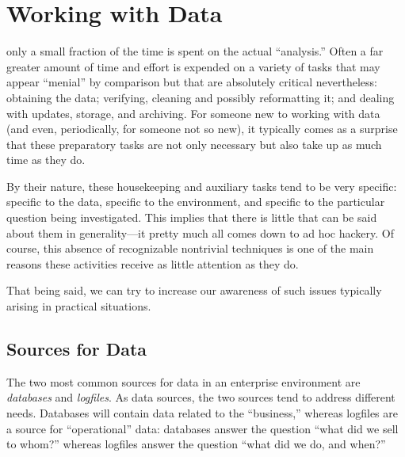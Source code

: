 

\chapter{Working with Data}{}{}
\label{app:data}

\makeatletter
\renewcommand\thefigure{C-\@arabic\c@figure}%
%
\renewcommand\thetable{C-\@arabic\c@table}%
\makeatother



 only a small fraction of the time is spent
on the actual ``analysis.'' Often a far greater amount of time and
effort is expended on a variety of tasks that may appear ``menial'' by
comparison but that are absolutely critical nevertheless: obtaining
the data; verifying, cleaning and possibly reformatting it; and
dealing with updates, storage, and archiving.  For someone new to
working with data (and even, periodically, for someone not so new), it
typically comes as a surprise that these preparatory tasks are not
only necessary but also take up as much time as they do.

By their nature, these housekeeping and auxiliary tasks tend to be
very specific: specific to the data, specific to the environment, and
specific to the particular question being investigated.  This implies
that there is little that can be said about them in generality---it
pretty much all comes down to ad hoc hackery. Of course, this absence
of recognizable nontrivial techniques is one of the main reasons these
activities receive as little attention as they do.

That being said, we can try to increase our awareness of such issues
typically arising in practical situations.\vspace*{-12pt}

\section{Sources for Data}


The two most common sources for data in an enterprise environment are
\emph{databases}  and \emph{logfiles}.  As data sources, the two
sources tend to address different needs. Databases will contain data related
to the ``business,'' whereas logfiles are a source for ``operational''
data: databases answer the question ``what did we sell to whom?''
whereas logfiles answer the question ``what did we do, and when?''

